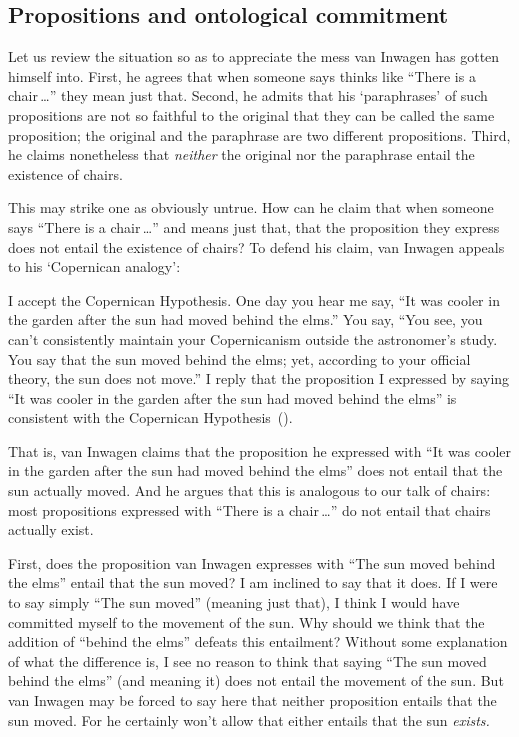 \documentclass[11pt]{article}
\newenvironment{squote}{%
	\begin{spacing}{1}
	\begin{list}{}{%
	\setlength{\labelwidth}{0pt}%
	\rightmargin\leftmargin%
	}
	\item\relax
	}{%
	\end{list}%
	\end{spacing}
	}
\begin{document}
\begin{spacing}{1.5}
\subsection{Propositions and ontological commitment}
Let us review the situation so as to appreciate the mess van Inwagen has gotten himself into. First, he agrees that when someone says thinks like ``There is a chair\,\ldots '' they mean just that. Second, he admits that his `paraphrases' of such propositions are not so faithful to the original that they can be called the same proposition; the original and the paraphrase are two different propositions. Third, he claims nonetheless that {\em neither} the original nor the paraphrase entail the existence of chairs.

This may strike one as obviously untrue. How can he claim that when someone says ``There is a chair\,\ldots '' and means just that, that the proposition they express does not entail the existence of chairs? To defend his claim, van Inwagen appeals to his `Copernican analogy':
\begin{squote}
I accept the Copernican Hypothesis. One day you hear me say, ``It was cooler in the garden after the sun had moved behind the elms.'' You say, ``You see, you can't consistently maintain your Copernicanism outside the astronomer's study. You say that the sun moved behind the elms; yet, according to your official theory, the sun does not move.'' I reply that the proposition I expressed by saying ``It was cooler in the garden after the sun had moved behind the elms'' is consistent with the Copernican Hypothesis~(\citeyear[101]{inwagen1995}).
\end{squote}
That is, van Inwagen claims that the proposition he expressed with ``It was cooler in the garden after the sun had moved behind the elms'' does not entail that the sun actually moved. And he argues that this is analogous to our talk of chairs: most propositions expressed with ``There is a chair\,\ldots '' do not entail that chairs actually exist.

First, does the proposition van Inwagen expresses with ``The sun moved behind the elms'' entail that the sun moved? I am inclined to say that it does. If I were to say simply ``The sun moved'' (meaning just that), I think I would have committed myself to the movement of the sun. Why should we think that the addition of ``behind the elms'' defeats this entailment? Without some explanation of what the difference is, I see no reason to think that saying ``The sun moved behind the elms'' (and meaning it) does not entail the movement of the sun. But van Inwagen may be forced to say here that neither proposition entails that the sun moved. For he certainly won't allow that either entails that the sun {\em exists.}


\end{spacing}
\end{document}
